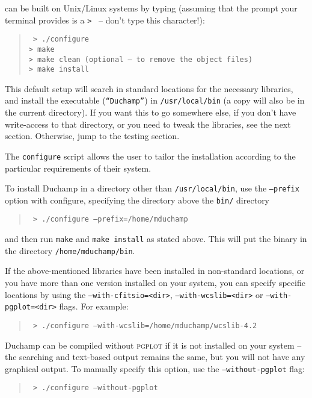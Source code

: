 
\duchamp can be built on Unix/Linux systems by typing (assuming that
the prompt your terminal provides is a \texttt{> } -- don't type this
character!):
\begin{quote}
{\footnotesize
\texttt{%
> ./configure\\
> make\\
> make clean (optional -- to remove the object files)\\
> make install }
}
\end{quote}

This default setup will search in standard locations for the necessary
libraries, and install the executable (\texttt{``Duchamp''}) in
\texttt{/usr/local/bin} (a copy will also be in the current
directory). If you want this to go somewhere else, \eg if you don't
have write-access to that directory, or you need to tweak the
libraries, see the next section. Otherwise, jump to the testing
section.


The \texttt{configure} script allows the user to tailor the
installation according to the particular requirements of their
system. 

To install Duchamp in a directory other than \texttt{/usr/local/bin},
use the \texttt{--prefix} option with configure, specifying the
directory above the \texttt{bin/} directory \eg
\begin{quote}
{\footnotesize
\texttt{%
> ./configure --prefix=/home/mduchamp}
}
\end{quote}
and then run \texttt{make} and \texttt{make install} as stated
above. This will put the binary in the directory
\texttt{/home/mduchamp/bin}. 

If the above-mentioned libraries have been installed in non-standard
locations, or you have more than one version installed on your system,
you can specify specific locations by using the
\texttt{--with-cfitsio=<dir>}, \texttt{--with-wcslib=<dir>} or
\texttt{--with-pgplot=<dir>} flags. For example:
\begin{quote}
{\footnotesize
\texttt{%
> ./configure --with-wcslib=/home/mduchamp/wcslib-4.2}
}
\end{quote}

Duchamp can be compiled without \textsc{pgplot} if it is not installed
on your system -- the searching and text-based output remains the
same, but you will not have any graphical output.  To manually specify
this option, use the \texttt{--without-pgplot} flag:
\begin{quote}
{\footnotesize
\texttt{%
> ./configure --without-pgplot}
}
\end{quote}

